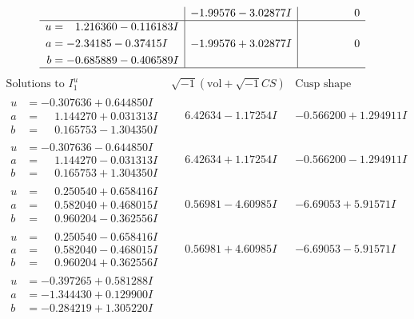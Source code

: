 \documentclass[1p]{elsarticle_modified}
\theoremstyle{definition}
\newcommand{\I}{\sqrt{-1}}
\begin{document}
$$\begin{array}{c|c|c}
 & -1.99576 - 3.02877 I & \phantom{-0.000000 } 0 \\ \hline\begin{aligned}
u &= \phantom{-}1.216360 - 0.116183 I \\
a &= -2.34185 - 0.37415 I \\
b &= -0.685889 - 0.406589 I\end{aligned}
 & -1.99576 + 3.02877 I & \phantom{-0.000000 } 0\\
 \hline 
 \end{array}$$\newpage$$\begin{array}{c|c|c}  
\text{Solutions to }I^u_{1}& \I (\text{vol} + \sqrt{-1}CS) & \text{Cusp shape}\\
 \hline 
\begin{aligned}
u &= -0.307636 + 0.644850 I \\
a &= \phantom{-}1.144270 + 0.031313 I \\
b &= \phantom{-}0.165753 - 1.304350 I\end{aligned}
 & \phantom{-}6.42634 - 1.17254 I & -0.566200 + 1.294911 I \\ \hline\begin{aligned}
u &= -0.307636 - 0.644850 I \\
a &= \phantom{-}1.144270 - 0.031313 I \\
b &= \phantom{-}0.165753 + 1.304350 I\end{aligned}
 & \phantom{-}6.42634 + 1.17254 I & -0.566200 - 1.294911 I \\ \hline\begin{aligned}
u &= \phantom{-}0.250540 + 0.658416 I \\
a &= \phantom{-}0.582040 + 0.468015 I \\
b &= \phantom{-}0.960204 - 0.362556 I\end{aligned}
 & \phantom{-}0.56981 - 4.60985 I & -6.69053 + 5.91571 I \\ \hline\begin{aligned}
u &= \phantom{-}0.250540 - 0.658416 I \\
a &= \phantom{-}0.582040 - 0.468015 I \\
b &= \phantom{-}0.960204 + 0.362556 I\end{aligned}
 & \phantom{-}0.56981 + 4.60985 I & -6.69053 - 5.91571 I \\ \hline\begin{aligned}
u &= -0.397265 + 0.581288 I \\
a &= -1.344430 + 0.129900 I \\
b &= -0.284219 + 1.305220 I\end{aligned}

\end{array}$$
\end{document}
